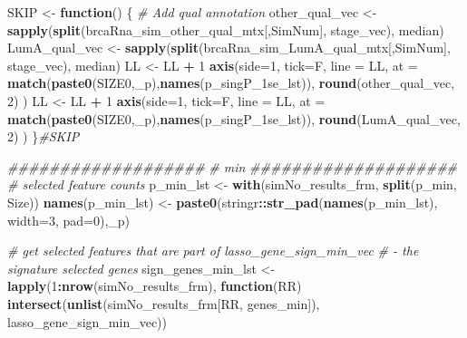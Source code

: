 \documentclass[
]{book}
\newenvironment{Shaded}{\begin{snugshade}}{\end{snugshade}}
\newcommand{\CommentTok}[1]{\textcolor[rgb]{0.56,0.35,0.01}{\textit{#1}}}
\newcommand{\ControlFlowTok}[1]{\textcolor[rgb]{0.13,0.29,0.53}{\textbf{#1}}}
\newcommand{\DataTypeTok}[1]{\textcolor[rgb]{0.13,0.29,0.53}{#1}}
\newcommand{\DecValTok}[1]{\textcolor[rgb]{0.00,0.00,0.81}{#1}}
\newcommand{\KeywordTok}[1]{\textcolor[rgb]{0.13,0.29,0.53}{\textbf{#1}}}
\newcommand{\NormalTok}[1]{#1}
\newcommand{\OperatorTok}[1]{\textcolor[rgb]{0.81,0.36,0.00}{\textbf{#1}}}
\newcommand{\StringTok}[1]{\textcolor[rgb]{0.31,0.60,0.02}{#1}}
\begin{document}
\begin{Shaded}
\begin{Highlighting}[]
\NormalTok{SKIP  <{-}}\StringTok{ }\ControlFlowTok{function}\NormalTok{() \{}
\CommentTok{\# Add qual annotation}
\NormalTok{other\_qual\_vec <{-}}\StringTok{ }\KeywordTok{sapply}\NormalTok{(}\KeywordTok{split}\NormalTok{(brcaRna\_sim\_other\_qual\_mtx[,SimNum], stage\_vec), median)}
\NormalTok{LumA\_qual\_vec <{-}}\StringTok{ }\KeywordTok{sapply}\NormalTok{(}\KeywordTok{split}\NormalTok{(brcaRna\_sim\_LumA\_qual\_mtx[,SimNum], stage\_vec), median)}
\NormalTok{LL <{-}}\StringTok{ }\NormalTok{LL }\OperatorTok{+}\StringTok{ }\DecValTok{1}
\KeywordTok{axis}\NormalTok{(}\DataTypeTok{side=}\DecValTok{1}\NormalTok{, }\DataTypeTok{tick=}\NormalTok{F, }\DataTypeTok{line =}\NormalTok{ LL,}
  \DataTypeTok{at =}  \KeywordTok{match}\NormalTok{(}\KeywordTok{paste0}\NormalTok{(SIZE0,}\StringTok{\textquotesingle{}\_p\textquotesingle{}}\NormalTok{),}\KeywordTok{names}\NormalTok{(p\_singP\_1se\_lst)),}
  \KeywordTok{round}\NormalTok{(other\_qual\_vec, }\DecValTok{2}\NormalTok{)}
\NormalTok{ )}
\NormalTok{LL <{-}}\StringTok{ }\NormalTok{LL }\OperatorTok{+}\StringTok{ }\DecValTok{1}
\KeywordTok{axis}\NormalTok{(}\DataTypeTok{side=}\DecValTok{1}\NormalTok{, }\DataTypeTok{tick=}\NormalTok{F, }\DataTypeTok{line =}\NormalTok{ LL,}
  \DataTypeTok{at =}  \KeywordTok{match}\NormalTok{(}\KeywordTok{paste0}\NormalTok{(SIZE0,}\StringTok{\textquotesingle{}\_p\textquotesingle{}}\NormalTok{),}\KeywordTok{names}\NormalTok{(p\_singP\_1se\_lst)),}
  \KeywordTok{round}\NormalTok{(LumA\_qual\_vec, }\DecValTok{2}\NormalTok{)}
\NormalTok{ )}
\NormalTok{\}}\CommentTok{\#SKIP}

\CommentTok{\#\#\#\#\#\#\#\#\#\#\#\#\#\#\#\#\#\#\#}
\CommentTok{\# min}
\CommentTok{\#\#\#\#\#\#\#\#\#\#\#\#\#\#\#\#\#\#\#\#}
\CommentTok{\# selected feature counts}
\NormalTok{p\_min\_lst <{-}}\StringTok{ }\KeywordTok{with}\NormalTok{(simNo\_results\_frm,}
 \KeywordTok{split}\NormalTok{(p\_min, Size))}
\KeywordTok{names}\NormalTok{(p\_min\_lst) <{-}}\StringTok{ }\KeywordTok{paste0}\NormalTok{(stringr}\OperatorTok{::}\KeywordTok{str\_pad}\NormalTok{(}\KeywordTok{names}\NormalTok{(p\_min\_lst), }\DataTypeTok{width=}\DecValTok{3}\NormalTok{, }\DataTypeTok{pad=}\StringTok{\textquotesingle{}0\textquotesingle{}}\NormalTok{),}\StringTok{\textquotesingle{}\_p\textquotesingle{}}\NormalTok{)}

\CommentTok{\# get selected features that are part of lasso\_gene\_sign\_min\_vec}
\CommentTok{\# {-} the signature selected genes}
\NormalTok{sign\_genes\_min\_lst <{-}}\StringTok{ }\KeywordTok{lapply}\NormalTok{(}\DecValTok{1}\OperatorTok{:}\KeywordTok{nrow}\NormalTok{(simNo\_results\_frm), }\ControlFlowTok{function}\NormalTok{(RR)}
    \KeywordTok{intersect}\NormalTok{(}\KeywordTok{unlist}\NormalTok{(simNo\_results\_frm[RR, }\StringTok{\textquotesingle{}genes\_min\textquotesingle{}}\NormalTok{]), lasso\_gene\_sign\_min\_vec))}


\end{Highlighting}
\end{Shaded}
\end{document}
